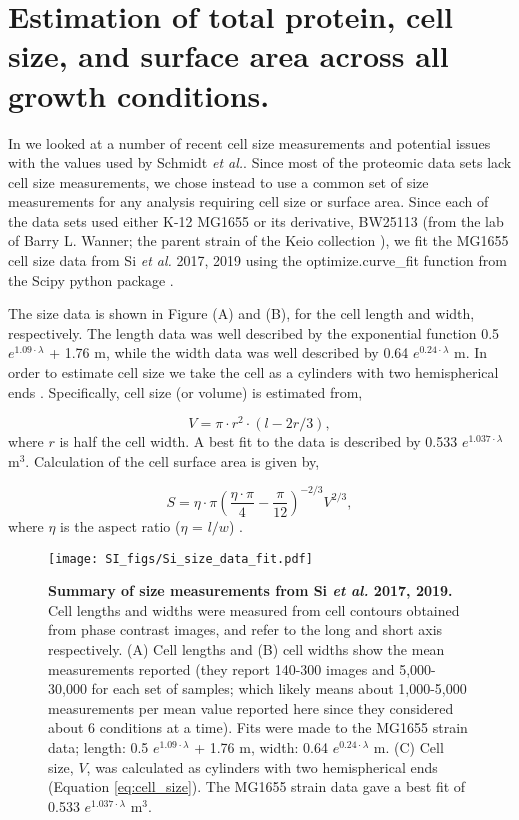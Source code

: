 \section{Estimation of total protein, cell size, and surface area across all growth conditions.}

In  we looked at a number of recent cell
size measurements and potential issues with the values used by Schmidt
\textit{et al.}. Since most of the proteomic data sets lack cell size
measurements, we chose instead to use a common set of size measurements for any
analysis requiring cell size or surface area.  Since each of the data sets used
either K-12 MG1655 or its derivative, BW25113 (from the lab of Barry L. Wanner;
the parent strain of the Keio collection \citep{datsenko2000, baba2006}), we fit
the MG1655 cell size data from Si \textit{et al.} 2017, 2019 using
the optimize.curve\_fit function from the Scipy python package \citep{2020scipynmeth}.

The size data is shown in Figure (A)
and (B),  for the cell length and width, respectively. The length data was well
described by the exponential function 0.5 $e^{1.09 \cdot \lambda}$ + 1.76
\textmu m, while the width data was well described by 0.64 $e^{0.24 \cdot \lambda}$
\textmu m. In order to estimate cell size we take the cell as a cylinders
with two hemispherical ends \citep{si2017, basan2015}. Specifically,  cell size
(or volume) is estimated from,

\begin{equation}
V = \pi \cdot r^2 \cdot (l - 2r/3),
\label{eq:cell_size}
\end{equation}
where $r$ is half the cell width. A best fit to the data is described by 0.533
$e^{1.037 \cdot \lambda}$ \textmu m$^3$. Calculation of the cell surface area is
given by,

\begin{equation}
 S = \eta \cdot \pi (\frac{\eta \cdot \pi}{4} - \frac{\pi}{12})^{-2/3} V^{2/3},
\end{equation}
where $\eta$ is the aspect ratio ($\eta$ = $l/w$) \citep{ojkic2019}.

\begin{figure}
		\centering
    \texttt{[image: SI\_figs/Si\_size\_data\_fit.pdf]}
    \caption{\textbf{Summary of size measurements from Si \textit{et al.} 2017,
    2019.} Cell lengths and widths were measured from cell contours obtained from
    phase contrast images, and refer to the long and short axis respectively. (A)
    Cell lengths and (B) cell widths show the mean measurements reported (they
    report 140-300 images and 5,000-30,000 for each set of samples; which likely
    means about 1,000-5,000 measurements per mean value reported here since they
    considered about 6 conditions at a time). Fits were made to the  MG1655 strain
    data; length: 0.5 $e^{1.09 \cdot \lambda}$ + 1.76 \textmu m, width:  0.64
    $e^{0.24 \cdot \lambda}$ \textmu m. (C) Cell size, $V$, was calculated as
    cylinders with two hemispherical ends (Equation \ref{eq:cell_size}). The
    MG1655 strain data gave a best fit of 0.533 $e^{1.037 \cdot \lambda}$ \textmu m$^3$.}
  \label{fig:final_size_data_Si}
\end{figure}
